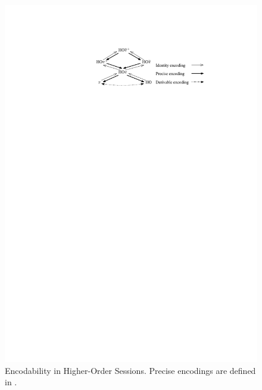 \begin{figure}[t]
\centering
\includegraphics[scale=1]{diag.pdf}

	\caption{Encodability in Higher-Order Sessions. 
	Precise encodings are defined in .
	\label{fig:express}}
\vspace{-5mm}
\Hlinefig
\end{figure}


